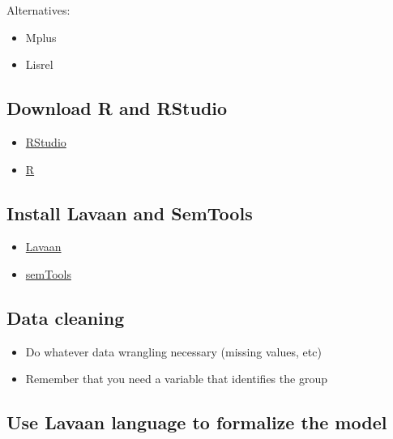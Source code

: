 \documentclass[
]{book}
\providecommand{\tightlist}{%
  \setlength{\itemsep}{0pt}\setlength{\parskip}{0pt}}
\begin{document}
Alternatives:

\begin{itemize}
\item
  Mplus
\item
  Lisrel
\end{itemize}

\hypertarget{download-r-and-rstudio}{%
\subsection{Download R and RStudio}\label{download-r-and-rstudio}}

\begin{itemize}
\tightlist
\item
  \href{https://www.rstudio.com/products/rstudio/download/}{RStudio}
\item
  \href{https://cran.r-project.org}{R}
\end{itemize}

\hypertarget{install-lavaan-and-semtools}{%
\subsection{Install Lavaan and SemTools}\label{install-lavaan-and-semtools}}

\begin{itemize}
\tightlist
\item
  \href{https://cran.r-project.org/web/packages/lavaan/index.html}{Lavaan}
\item
  \href{https://cran.r-project.org/web/packages/semTools/index.html}{semTools}
\end{itemize}

\hypertarget{data-cleaning}{%
\subsection{Data cleaning}\label{data-cleaning}}

\begin{itemize}
\item
  Do whatever data wrangling necessary (missing values, etc)
\item
  Remember that you need a variable that identifies the group
\end{itemize}

\hypertarget{use-lavaan-language-to-formalize-the-model}{%
\subsection{Use Lavaan language to formalize the model}\label{use-lavaan-language-to-formalize-the-model}}
\end{document}
